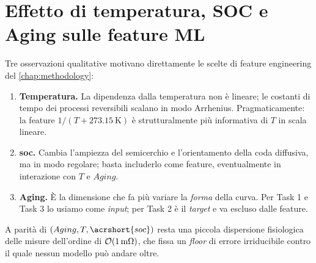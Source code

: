 \section{Effetto di temperatura, SOC e Aging sulle feature ML}

Tre osservazioni qualitative motivano direttamente le scelte di
feature engineering del \cref{chap:methodology}:
\begin{enumerate}[leftmargin=*]
  \item \textbf{Temperatura.} La dipendenza dalla temperatura non è
        lineare; le costanti di tempo dei processi reversibili scalano
        in modo Arrhenius. Pragmaticamente: la feature
        $1 / (T + \SI{273.15}{\kelvin})$ è strutturalmente più
        informativa di $T$ in scala lineare.
  \item \textbf{\acrshort{soc}.} Cambia l'ampiezza del semicerchio e
        l'orientamento della coda diffusiva, ma in modo regolare; basta
        includerlo come feature, eventualmente in interazione con
        $T$ e $Aging$.
  \item \textbf{Aging.} È la dimensione che fa più variare la
        \emph{forma} della curva. Per Task 1 e Task 3 lo usiamo come
        \emph{input}; per Task 2 è il \emph{target} e va escluso dalle
        feature.
\end{enumerate}

A parità di $(Aging, T, \acrshort{soc})$ resta una piccola dispersione
fisiologica delle misure dell'ordine di
$\mathcal{O}(\SI{1}{\ensuremath{\si{\milli\ohm}}})$, che fissa un \emph{floor} di errore
irriducibile contro il quale nessun modello può andare oltre.

